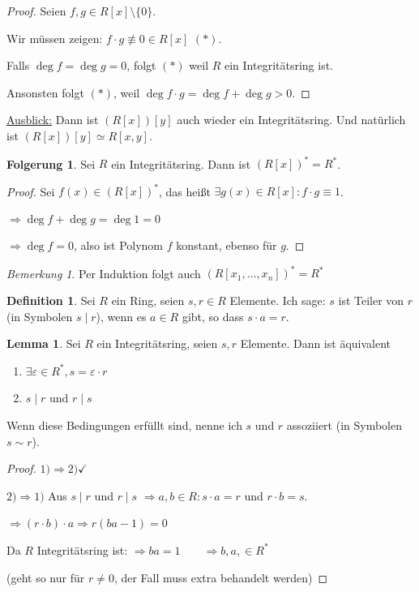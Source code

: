 \documentclass[12pt,parskip=full]{scrartcl}
\newcommand{\heading}{\underline}
\theoremstyle{definition}
\newtheorem{corollary}[theorem]{Folgerung}
\newtheorem{lemma}[theorem]{Lemma}
\newtheorem{definition}[theorem]{Definition}
\theoremstyle{remark}
\newtheorem*{remark}{Bemerkung}
\begin{document}
 	\begin{proof}
 		Seien $f,g \in R[x] \setminus \{0\}$.
 		
 		Wir müssen zeigen: $f \cdot g \not\equiv 0 \in R[x]$ $(*)$.
 		
 		Falls $\deg f = \deg g = 0$, folgt $(*)$ weil $R$ ein Integritätsring ist.
 		
 		Ansonsten folgt $(*)$, weil $\deg f \cdot g = \deg f + \deg g > 0$.
 	\end{proof}
 
 	\heading{Ausblick:} Dann ist $(R[x])[y]$ auch wieder ein Integritätsring. Und natürlich ist $(R[x])[y] \simeq R[x,y]$.
 	
 	\begin{corollary}
 		Sei $R$ ein Integritätsring. Dann ist $(R[x])^* = R^*$.
 	\end{corollary}
 
 	\begin{proof}
 		Sei $f(x) \in (R[x])^*$, das heißt $\exists g(x) \in R[x]: f \cdot g \equiv 1$.
 		
 		$\Rightarrow \deg f + \deg g = \deg 1 = 0$
 		
 		$\Rightarrow \deg f = 0$, also ist Polynom $f$ konstant, ebenso für $g$. 
 	\end{proof}
 
 	\begin{remark}
 		Per Induktion folgt auch $(R[x_1, \dots, x_n])^* = R^*$
 	\end{remark}
 
 	\begin{definition}
 		Sei $R$ ein Ring, seien $s, r \in R$ Elemente. Ich sage: $s$ ist Teiler von $r$ (in Symbolen $s \mid r$), wenn es $a \in R$ gibt, so dass $s \cdot a = r$.
 	\end{definition}
 
 	\begin{lemma}
 		Sei $R$ ein Integritätsring, seien $s,r$ Elemente. Dann ist äquivalent
 		\begin{enumerate}
 			\item $\exists \varepsilon \in R^*, s = \varepsilon \cdot r$
 			\item $s \mid r$ und $r \mid s$
 		\end{enumerate}
 	
 	Wenn diese Bedingungen erfüllt sind, nenne ich $s$ und $r$ assoziiert (in Symbolen $s \sim r$).
 	\end{lemma}
 
 	\begin{proof}
 		$1) \Rightarrow 2) \checkmark$
 		
 		$2) \Rightarrow 1)$ Aus $s \mid r$ und $r \mid s$ $\Rightarrow a,b \in R: s \cdot a = r$ und $r \cdot b = s$.
 		
 		$\Rightarrow (r \cdot b) \cdot a \Rightarrow r(ba - 1) = 0$
 		
 		Da $R$ Integritätsring ist: $\Rightarrow ba = 1 \qquad \Rightarrow b,a, \in R^*$
 		
 		(geht so nur für $r \neq 0$, der Fall muss extra behandelt werden)
 	\end{proof}
 
\end{document}

